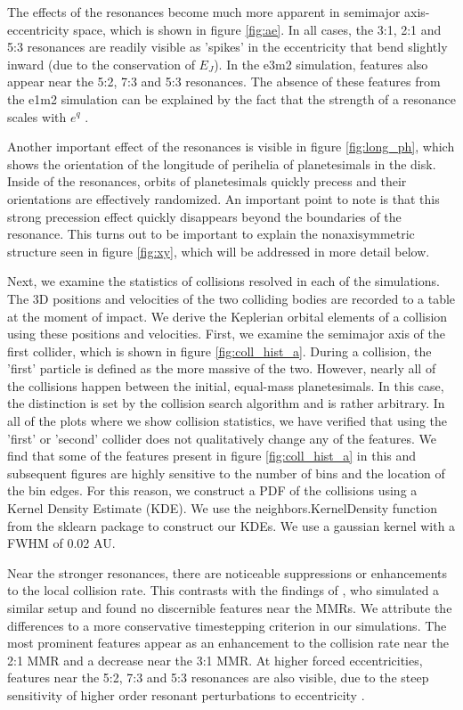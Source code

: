 \documentclass[twocolumn]{aastex63}
\begin{document}
The effects of the resonances become much more apparent in semimajor axis-eccentricity space, which is shown in figure \ref{fig:ae}. In all cases, 
the 3:1, 2:1 and 5:3 resonances are readily visible as 'spikes' in the eccentricity that bend slightly inward (due to the conservation of $E_{J}$). In the 
e3m2 simulation, features also appear near the 5:2, 7:3 and 5:3 resonances. The absence of these features from the e1m2 simulation can be 
explained by the fact that the strength of a resonance scales with $e^{q}$ \citep{1994PhyD...77..289M}.

Another important effect of the resonances is visible in figure \ref{fig:long_ph}, which shows the orientation of the longitude of perihelia of 
planetesimals in the disk. Inside of the resonances, orbits of planetesimals quickly precess and their orientations are effectively randomized. An 
important point to note is that this strong precession effect quickly disappears beyond the boundaries of the resonance. This turns out to be 
important to explain the nonaxisymmetric structure seen in figure \ref{fig:xy}, which will be addressed in more detail below.

Next, we examine the statistics of collisions resolved in each of the simulations. The 3D positions and velocities of the two colliding bodies are 
recorded to a table at the moment of impact. We derive the Keplerian orbital elements of a collision using these positions and velocities. 
First, we examine the semimajor axis of the first collider, which is shown in figure \ref{fig:coll_hist_a}. During a collision, the 'first' particle is defined 
as the more massive of the two. However, nearly all of the collisions happen between the initial, equal-mass planetesimals. In this case, the 
distinction is set by the collision search algorithm and is rather arbitrary. In all of the plots where we show collision statistics, we have verified that 
using the 'first' or 'second' collider does not qualitatively change any of the features. We find that some of the features present in figure 
\ref{fig:coll_hist_a} in this and subsequent figures are highly sensitive to the number of bins and the location of the bin edges. For this reason, we 
construct a PDF of the collisions using a Kernel Density Estimate (KDE). We use the {\sc neighbors.KernelDensity} function from the {\sc sklearn} 
\citep{scikit-learn} package to construct our KDEs. We use a gaussian kernel with a FWHM of 0.02 AU.

Near the stronger resonances, there are noticeable suppressions or enhancements to the local collision rate. This contrasts with the findings of 
\citet{2000Icar..143...45R}, who simulated a similar setup and found no discernible features near the MMRs. We attribute the differences to a more 
conservative timestepping criterion in our simulations. The most prominent features appear as an enhancement to the collision rate near the 2:1 
MMR and a decrease near the 3:1 MMR. At higher forced eccentricities, features near the 5:2, 7:3 and 5:3 resonances are also visible, due to the 
steep sensitivity of higher order resonant perturbations to eccentricity \citep{1994PhyD...77..289M}.
\end{document}
